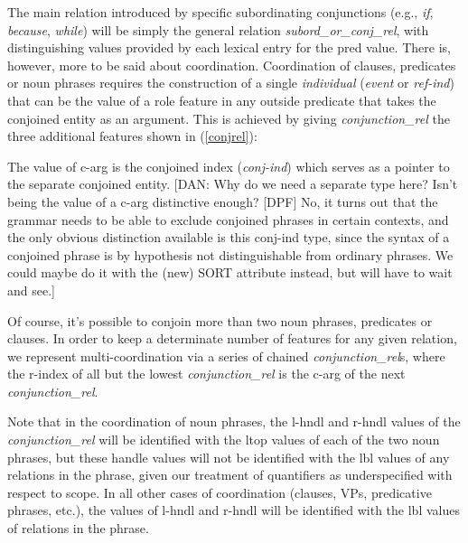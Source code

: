 \documentclass[12pt]{article}
\newcommand{\es}{\enumsentence}
\begin{document}
The main relation introduced by specific subordinating conjunctions (e.g., 
{\it if}, {\it because}, {\it while}) will be simply the general relation
{\it subord\_or\_conj\_rel}, with distinguishing values provided by
each lexical entry for the {\sc pred} value.  There
is, however, more to be said about coordination.  Coordination of clauses,
predicates or noun phrases requires the construction of a single {\it
individual} ({\it event} or {\it ref-ind}) that can be the value of a
role feature in any outside predicate that takes the conjoined
entity as an argument.  This is achieved by giving {\it conjunction\_rel}
the three additional features shown in (\ref{conjrel}):

\es{\label{conjrel}
\begin{avm}
\[ c-arg & conj-ind\\
   l-index & index\\ 
   r-index & index \]
\end{avm}
}
%
The value of {\sc c-arg} is the conjoined index ({\it conj-ind}) which
serves as a pointer to the separate conjoined entity.  [DAN: Why
do we need a separate type here?  Isn't being the value of a 
{\sc c-arg} distinctive enough? [DPF] No, it turns out that the grammar needs
to be able to exclude conjoined phrases in certain contexts, and the only
obvious distinction available is this conj-ind type, since the syntax of a
conjoined phrase is by hypothesis not distinguishable from ordinary phrases.
We could maybe do it with the (new) SORT attribute instead, but will have to
wait and see.]

Of course, it's possible to conjoin more than two noun phrases,
predicates or clauses.  In order to keep a determinate number of
features for any given relation, we represent multi-coordination via a
series of chained {\it conjunction\_rel}s, where the {\sc r-index} of
all but the lowest {\it conjunction\_rel} is the {\sc c-arg} of the next
{\it conjunction\_rel}.

Note that in the coordination of noun phrases, the {\sc l-hndl} and 
{\sc r-hndl} values of the {\it conjunction\_rel} will be identified with the
{\sc ltop} values of each of the two noun phrases, but these handle values
will not be identified with the {\sc lbl} values of any relations in the
phrase, given our treatment of quantifiers as underspecified with respect to
scope.  In all other cases of coordination (clauses, VPs, predicative phrases,
etc.), the values of {\sc l-hndl} and {\sc r-hndl} will be identified with
the {\sc lbl} values of relations in the phrase.
\end{document}
